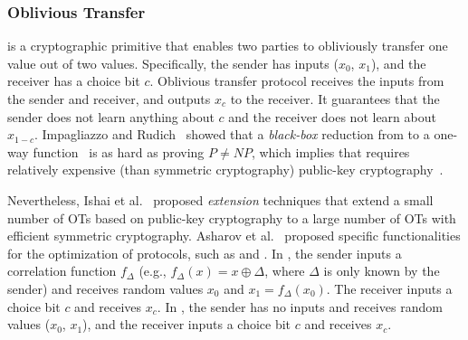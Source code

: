 \subsubsection{Oblivious Transfer}
\label{subsubsec:OT}

\ot is a cryptographic primitive that enables two parties to obliviously transfer one value out of two values. Specifically, the sender has inputs ($x_0$, $x_1$), and the receiver has a choice bit $c$. Oblivious transfer protocol receives the inputs from the sender and receiver, and outputs $x_c$ to the receiver. It guarantees that the sender does not learn anything about $c$ and the receiver does not learn about $x_{1-c}$.
Impagliazzo and Rudich~\cite{impagliazzo1989limits} showed that a \textit{black-box} reduction from \ot to a one-way function~\cite[Chapter~2]{oded2006foundations} is as hard as proving $P\neq NP$, which implies that \ot requires relatively expensive (than symmetric cryptography) public-key cryptography~\cite{rivest1978method}.

Nevertheless, Ishai et al.~\cite{ishai2003extending} proposed \ot \textit{extension} techniques that extend a small number of OTs based on public-key cryptography to a large number of OTs with efficient symmetric cryptography.
Asharov et al.~\cite{asharov2017more} proposed specific \ot functionalities for the optimization of \smpc protocols, such as \correlatedot and \randomot. In \correlatedot, the sender inputs a correlation function $f_{\Delta }$ (e.g., $f_{\Delta }\left(x\right)=x\oplus \Delta $, where $\Delta$ is only known by the sender) and receives random values $x_0$ and $x_1=f_{\Delta }\left(x_0\right)$. The receiver inputs a choice bit $c$ and receives $x_{c}$. In \randomot, the sender has no inputs and receives random values ($x_0$, $x_1$), and the receiver inputs a choice bit $c$ and receives $x_c$.

